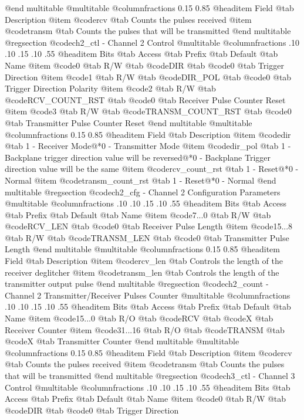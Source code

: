 @end multitable
@multitable @columnfractions 0.15 0.85
@headitem Field @tab Description
@item @code{rcv} @tab Counts the pulses received
@item @code{transm} @tab Counts the pulses that will be transmitted
@end multitable
@regsection @code{ch2_ctl} - Channel 2 Control
@multitable @columnfractions .10 .10 .15 .10 .55
@headitem Bits @tab Access @tab Prefix @tab Default @tab Name
@item @code{0}
@tab R/W @tab
@code{DIR}
@tab @code{0} @tab 
Trigger Direction
@item @code{1}
@tab R/W @tab
@code{DIR_POL}
@tab @code{0} @tab 
Trigger Direction Polarity
@item @code{2}
@tab R/W @tab
@code{RCV_COUNT_RST}
@tab @code{0} @tab 
Receiver Pulse Counter Reset
@item @code{3}
@tab R/W @tab
@code{TRANSM_COUNT_RST}
@tab @code{0} @tab 
Transmitter Pulse Counter Reset
@end multitable
@multitable @columnfractions 0.15 0.85
@headitem Field @tab Description
@item @code{dir} @tab 1 - Receiver Mode@*0 - Transmitter Mode
@item @code{dir_pol} @tab 1 - Backplane trigger direction value will be reversed@*0 - Backplane Trigger direction value will be the same
@item @code{rcv_count_rst} @tab 1 - Reset@*0 - Normal
@item @code{transm_count_rst} @tab 1 - Reset@*0 - Normal
@end multitable
@regsection @code{ch2_cfg} - Channel 2 Configuration Parameters
@multitable @columnfractions .10 .10 .15 .10 .55
@headitem Bits @tab Access @tab Prefix @tab Default @tab Name
@item @code{7...0}
@tab R/W @tab
@code{RCV_LEN}
@tab @code{0} @tab 
Receiver Pulse Length
@item @code{15...8}
@tab R/W @tab
@code{TRANSM_LEN}
@tab @code{0} @tab 
Transmitter Pulse Length
@end multitable
@multitable @columnfractions 0.15 0.85
@headitem Field @tab Description
@item @code{rcv_len} @tab Controls the length of the receiver deglitcher
@item @code{transm_len} @tab Controls the length of the transmitter output pulse
@end multitable
@regsection @code{ch2_count} - Channel 2 Transmitter/Receiver Pulses Counter
@multitable @columnfractions .10 .10 .15 .10 .55
@headitem Bits @tab Access @tab Prefix @tab Default @tab Name
@item @code{15...0}
@tab R/O @tab
@code{RCV}
@tab @code{X} @tab 
Receiver Counter
@item @code{31...16}
@tab R/O @tab
@code{TRANSM}
@tab @code{X} @tab 
Transmitter Counter
@end multitable
@multitable @columnfractions 0.15 0.85
@headitem Field @tab Description
@item @code{rcv} @tab Counts the pulses received
@item @code{transm} @tab Counts the pulses that will be transmitted
@end multitable
@regsection @code{ch3_ctl} - Channel 3 Control
@multitable @columnfractions .10 .10 .15 .10 .55
@headitem Bits @tab Access @tab Prefix @tab Default @tab Name
@item @code{0}
@tab R/W @tab
@code{DIR}
@tab @code{0} @tab 
Trigger Direction
